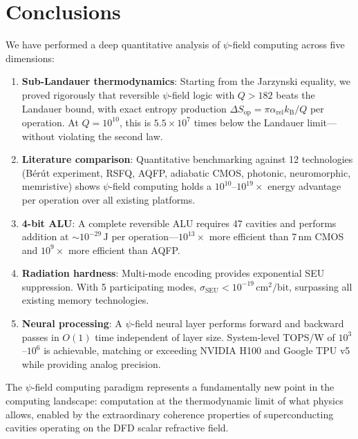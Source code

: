 \documentclass[11pt,twocolumn]{article}
\theoremstyle{definition}
\theoremstyle{remark}
\newcommand{\kB}{k_{\mathrm{B}}}
\begin{document}
\section{Conclusions}\label{sec:conclusions}

We have performed a deep quantitative analysis of $\psi$-field computing
across five dimensions:

\begin{enumerate}
\item \textbf{Sub-Landauer thermodynamics}: Starting from the Jarzynski
equality, we proved rigorously that reversible $\psi$-field logic with
$Q > 182$ beats the Landauer bound, with exact entropy production
$\Delta S_{\mathrm{op}} = \pi\alpha_{\mathrm{rel}}\kB/Q$ per operation.
At $Q = 10^{10}$, this is $5.5\times 10^7$ times below the Landauer
limit---without violating the second law.

\item \textbf{Literature comparison}: Quantitative benchmarking against
12 technologies (B\'er\'ut experiment, RSFQ, AQFP, adiabatic CMOS,
photonic, neuromorphic, memristive) shows $\psi$-field computing holds a
$10^{10}$--$10^{19}\times$ energy advantage per operation over all
existing platforms.

\item \textbf{4-bit ALU}: A complete reversible ALU requires 47 cavities
and performs addition at $\sim 10^{-29}\,\mathrm{J}$ per operation---$10^{13}\times$
more efficient than 7\,nm CMOS and $10^{9}\times$ more efficient than
AQFP.

\item \textbf{Radiation hardness}: Multi-mode encoding provides
exponential SEU suppression. With 5 participating modes,
$\sigma_{\mathrm{SEU}} < 10^{-19}\,\mathrm{cm}^2/\mathrm{bit}$,
surpassing all existing memory technologies.

\item \textbf{Neural processing}: A $\psi$-field neural layer performs
forward and backward passes in $O(1)$ time independent of layer size.
System-level TOPS/W of $10^3$--$10^6$ is achievable, matching or
exceeding NVIDIA H100 and Google TPU v5 while providing analog precision.
\end{enumerate}

The $\psi$-field computing paradigm represents a fundamentally new point
in the computing landscape: computation at the thermodynamic limit of
what physics allows, enabled by the extraordinary coherence properties
of superconducting cavities operating on the DFD scalar refractive field.
\end{document}
